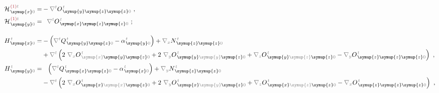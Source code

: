 \begin{subequations} \label{eq:H^(2-0)_0=}
\begin{align}
	{\mathcal{H}}^{\;\!\textcolor{Maroon}{(1)}\mathcolor{gray}{t}}_{\;\! \symup{x} \mathcolor{gray}{0}} = &- \mathcolor{gray}{\nabla^t}
	O^{\;\!\mathcolor{gray}{t}}_{\;\!\symup{y}\symup{z}\symup{z}\mathcolor{gray}{0}}~, \label{eq:H^(1)_x0=} \\
	{\mathcal{H}}^{\;\!\textcolor{Maroon}{(1)}\mathcolor{gray}{t}}_{\;\! \symup{y} \mathcolor{gray}{0}} = &\hphantom{+} \mathcolor{gray}{\nabla^t}
	O^{\;\!\mathcolor{gray}{t}}_{\;\!\symup{x}\symup{z}\symup{z}\mathcolor{gray}{0}}~; \label{eq:H^(1)_y0=} \\[1.0em]
	H^{\;\!\mathcolor{gray}{t}}_{\;\! \symup{x}\mathcolor{gray}{0}} = & - \left( \mathcolor{gray}{\nabla^t} Q^{\;\!\mathcolor{gray}{t}}_{\;\! \symup{y} \symup{z} \mathcolor{gray}{0}} - 
	{\alpha}^{\;\!\mathcolor{gray}{t}}_{\;\! \symup{y}\mathcolor{gray}{0}} \right) + \mathcolor{gray}{\nabla_x} N^{\;\!\mathcolor{gray}{t}}_{\;\!\symup{z} \symup{z} \mathcolor{gray}{0}} \label{eq:H_x0=} \\ & + \mathcolor{gray}{\nabla^t} \left( 2~ \mathcolor{gray}{\nabla_x} O^{\;\!\mathcolor{gray}{t}}_{\;\! \mathcolor{gray}{\symup{x}} \symup{y} \symup{z} \mathcolor{gray}{0}} + 2~ \mathcolor{gray}{\nabla_y}  O^{\;\!\mathcolor{gray}{t}}_{\;\! \symup{y} \mathcolor{gray}{\symup{y}} \symup{z} \mathcolor{gray}{0}} + \mathcolor{gray}{\nabla_z} O^{\;\!\mathcolor{gray}{t}}_{\;\! \symup{y} \mathcolor{gray}{\symup{z}} \symup{z} \mathcolor{gray}{0}} - \mathcolor{gray}{\nabla_y} O^{\;\!\mathcolor{gray}{t}}_{\;\! \symup{z} \symup{z} \symup{z} \mathcolor{gray}{0}} \right)~, \\
	H^{\;\!\mathcolor{gray}{t}}_{\;\! \symup{y}\mathcolor{gray}{0}} = &\hphantom{+} \left( \mathcolor{gray}{\nabla^t} Q^{\;\!\mathcolor{gray}{t}}_{\;\! \symup{x} \symup{z} \mathcolor{gray}{0}} -
	{\alpha}^{\;\!\mathcolor{gray}{t}}_{\;\! \symup{x}\mathcolor{gray}{0}} \right) + \mathcolor{gray}{\nabla_y} N^{\;\!\mathcolor{gray}{t}}_{\;\! \symup{z} \symup{z} \mathcolor{gray}{0}} \label{eq:H_y0=} \\ & - \mathcolor{gray}{\nabla^t} \left( 2~ \mathcolor{gray}{\nabla_x} O^{\;\!\mathcolor{gray}{t}}_{\;\! \symup{x} \mathcolor{gray}{\symup{x}} \symup{z} \mathcolor{gray}{0}} + 2~ \mathcolor{gray}{\nabla_y}  O^{\;\!\mathcolor{gray}{t}}_{\;\! \symup{x} \mathcolor{gray}{\symup{y}} \symup{z} \mathcolor{gray}{0}} + \mathcolor{gray}{\nabla_z}  O^{\;\!\mathcolor{gray}{t}}_{\;\! \symup{x} \mathcolor{gray}{\symup{z}} \symup{z} \mathcolor{gray}{0}} - \mathcolor{gray}{\nabla_x}  O^{\;\!\mathcolor{gray}{t}}_{\;\! \symup{z} \symup{z} \symup{z} \mathcolor{gray}{0}} \right)~, \\

\end{align}
\end{subequations}
